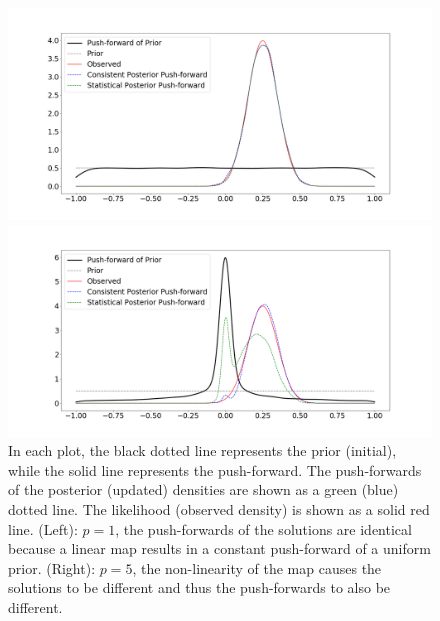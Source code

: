 \begin{ex}
\begin{figure}
\begin{minipage}{.45\textwidth}
		\includegraphics[width=\linewidth]{./images/comparison1}
\end{minipage}
\begin{minipage}{.45\textwidth}
		\includegraphics[width=\linewidth]{./images/comparison5}
\end{minipage}
\caption{
In each plot, the black dotted line represents the prior (initial), while the solid line represents the push-forward.
The push-forwards of the posterior (updated) densities are shown as a green (blue) dotted line.
The likelihood (observed density) is shown as a solid red line.
(Left): $p = 1$, the push-forwards of the solutions are identical because a linear map results in a constant push-forward of a uniform prior.
(Right): $p = 5$, the non-linearity of the map causes the solutions to be different and thus the push-forwards to also be different.
}
\label{fig:comparison}
\end{figure}


\end{ex}
